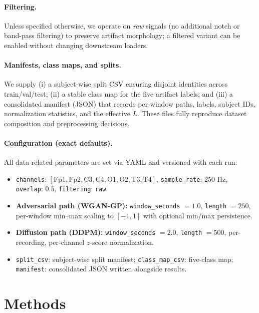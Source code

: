 \documentclass{article}
\begin{document}
\paragraph{Filtering.}
Unless specified otherwise, we operate on \emph{raw} signals (no additional notch or band-pass filtering) to preserve artifact morphology; a filtered variant can be enabled without changing downstream loaders.

\paragraph{Manifests, class maps, and splits.}
We supply (i) a subject-wise split CSV ensuring disjoint identities across train/val/test; (ii) a stable class map for the five artifact labels; and (iii) a consolidated manifest (JSON) that records per-window paths, labels, subject IDs, normalization statistics, and the effective \(L\). These files fully reproduce dataset composition and preprocessing decisions.

\paragraph{Configuration (exact defaults).}
All data-related parameters are set via YAML and versioned with each run:
\begin{itemize}
\item \texttt{channels}: \([ \text{Fp1}, \text{Fp2}, \text{C3}, \text{C4}, \text{O1}, \text{O2}, \text{T3}, \text{T4} ]\), \quad \texttt{sample\_rate}: \(250\) Hz, \quad \texttt{overlap}: \(0.5\), \quad \texttt{filtering}: \texttt{raw}.
\item \textbf{Adversarial path (WGAN-GP):} \texttt{window\_seconds} \(= 1.0\), \texttt{length} \(= 250\), per-window min--max scaling to \([-1,1]\) with optional min/max persistence.
\item \textbf{Diffusion path (DDPM):} \texttt{window\_seconds} \(= 2.0\), \texttt{length} \(= 500\), per-recording, per-channel \(z\)-score normalization.
\item \texttt{split\_csv}: subject-wise split manifest; \texttt{class\_map\_csv}: five-class map; \texttt{manifest}: consolidated JSON written alongside results.
\end{itemize}


\section{Methods}
\end{document}

